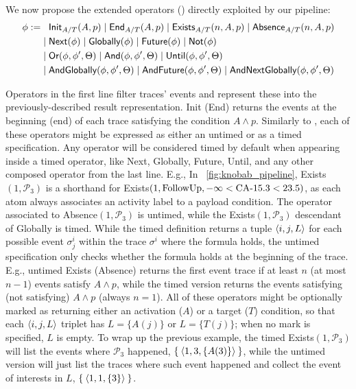 We now propose the extended \LTLf operators (\xLTLf) directly exploited by our pipeline:
\[\begin{split}
\phi:=&\;\;\;\textsf{Init}_{A/T}(A,p)\;|\;\textsf{End}_{A/T}(A,p)\;|\;\textsf{Exists}_{A/T}(n,A,p)\;|\;\textsf{Absence}_{A/T}(n,A,p)\\
     &\;|\; \textsf{Next}(\phi)\;|\; \textsf{Globally}(\phi)\;|\; \textsf{Future}(\phi)\;|\; \textsf{Not}(\phi)\\
     &\;|\; \textsf{Or}(\phi,\phi',\Theta)\;|\; \textsf{And}(\phi,\phi',\Theta)\;|\; \textsf{Until}(\phi,\phi',\Theta)\\
     &\;|\; \textsf{AndGlobally}(\phi,\phi',\Theta)\;|\; \textsf{AndFuture}(\phi,\phi',\Theta)\;|\; \textsf{AndNextGlobally}(\phi,\phi',\Theta)\\
\end{split}\]

Operators in the first line filter traces' events and represent these into the previously-described result representation. 
\textsf{Init} (\textsf{End}) returns the events at the beginning (end) of each trace satisfying the condition $A\wedge p$. Similarly to \cite{BurattinMS16}, each of these operators might be expressed as either an untimed or as a timed specification. Any operator will be considered timed by default when appearing inside a timed operator, like \textsf{Next}, \textsf{Globally}, \textsf{Future}, \textsf{Until}, and any other composed operator from the last line. E.g., In \figurename~\ref{fig:knobab_pipeline}, \textsf{Exists}$(1,\mathcal{P}_3)$ is a shorthand for \textsf{Exists}$(1,\textrm{FollowUp},-\infty<\textup{CA-15.3}<23.5)$, as each atom always associates an activity label to a payload condition. The operator associated to \textsf{Absence}$(1,\mathcal{P}_3)$ is untimed, while the \textsf{Exists}$(1,\mathcal{P}_3)$ descendant of \textsf{Globally} is timed.  While the timed definition returns a tuple $\braket{i,j,L}$ for each possible event $\sigma^i_j$ within the trace $\sigma^i$ where the formula holds, the untimed specification only checks whether the formula holds at the beginning of the trace. E.g., untimed \textsf{Exists} (\textsf{Absence}) returns the first event trace if at least $n$ (at most $n-1$) events satisfy $A\wedge p$, while the timed version returns the events satisfying (not satisfying) $A\wedge p$ (always $n=1$). All of these operators might be optionally marked as returning either an activation ($A$) or a target ($T$) condition, so that each  $\braket{i,j,L}$ triplet has $L=\{A(j)\}$ or $L=\{T(j)\}$; when no mark is specified, $L$ is empty. To wrap up the previous example, the timed  \textsf{Exists}$(1,\mathcal{P}_3)$ will list the events where $\mathcal{P}_3$ happened, $\Set{\braket{1,3,\{A(3)\}}}$, while the untimed version will just list the traces where such event happened and collect the event of interests in $L$, $\Set{\braket{1,1,\{3\}}}$.

